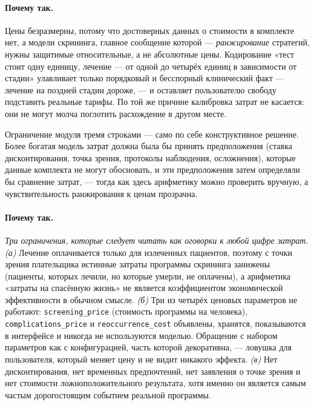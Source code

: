 \documentclass[12pt,a4paper]{article}
\newcommand{\id}[1]{\texttt{#1}}
\newcommand{\why}[1]{\paragraph{Почему так.} #1}
\begin{document}
\why{Цены безразмерны, потому что достоверных данных о стоимости в комплекте нет, а модели скрининга,
главное сообщение которой --- \emph{ранжирование} стратегий, нужны защитимые относительные, а не абсолютные
цены. Кодирование «тест стоит одну единицу, лечение --- от одной до четырёх единиц в зависимости от стадии»
улавливает только порядковый и бесспорный клинический факт --- лечение на поздней стадии дороже, --- и
оставляет пользователю свободу подставить реальные тарифы. По той же причине калибровка затрат не касается:
они не могут молча поглотить расхождение в другом месте.

Ограничение модуля тремя строками --- само по себе конструктивное решение. Более богатая модель затрат
должна была бы принять предположения (ставка дисконтирования, точка зрения, протоколы наблюдения,
осложнения), которые данные комплекта не могут обосновать, и эти предположения затем определяли бы сравнение
затрат, --- тогда как здесь арифметику можно проверить вручную, а чувствительность ранжирования к ценам
прозрачна.}

\why{\emph{Три ограничения, которые следует читать как оговорки к любой цифре затрат.}
\emph{(а)} Лечение оплачивается только для излеченных пациентов, поэтому с точки зрения плательщика истинные
затраты программы скрининга занижены (пациенты, которых лечили, но которые умерли, не оплачены), а арифметика
«затраты на спасённую жизнь» не является коэффициентом экономической эффективности в обычном смысле.
\emph{(б)} Три из четырёх ценовых параметров не работают: \id{screening\_price} (стоимость программы на
человека), \id{complications\_price} и \id{reoccurrence\_cost} объявлены, хранятся, показываются в
интерфейсе и никогда не используются моделью. Обращение с набором параметров как с конфигурацией, часть
которой декоративна, --- ловушка для пользователя, который меняет цену и не видит никакого эффекта.
\emph{(в)} Нет дисконтирования, нет временных предпочтений, нет заявления о точке зрения и нет стоимости
ложноположительного результата, хотя именно он является самым частым дорогостоящим событием реальной
программы.}
\end{document}
